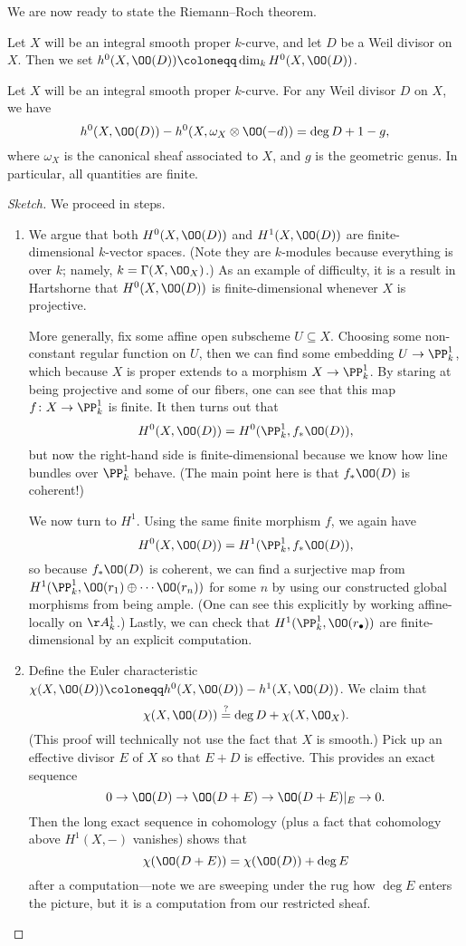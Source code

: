 \documentclass[../notes.tex]{subfiles}
\begin{document}
We are now ready to state the Riemann--Roch theorem.
\begin{notation}
	Let $X$ will be an integral smooth proper $k$-curve, and let $D$ be a Weil divisor on $X$. Then we set $h^0(X,\OO(D))\coloneqq\dim_kH^0(X,\OO(D))$.
\end{notation}
\begin{theorem} \label{thm:rr}
	Let $X$ will be an integral smooth proper $k$-curve. For any Weil divisor $D$ on $X$, we have
	\[h^0(X,\OO(D))-h^0(X,\omega_X\otimes\OO(-d))=\deg D+1-g,\]
	where $\omega_X$ is the canonical sheaf associated to $X$, and $g$ is the geometric genus. In particular, all quantities are finite.
\end{theorem}
\begin{proof}[Sketch]
	We proceed in steps.
	\begin{enumerate}
		\item We argue that both $H^0(X,\OO(D))$ and $H^1(X,\OO(D))$ are finite-dimensional $k$-vector spaces. (Note they are $k$-modules because everything is over $k$; namely, $k=\Gamma(X,\OO_X)$.) As an example of difficulty, it is a result in Hartshorne \cite[Theorem~5.19]{hartshorne} that $H^0(X,\OO(D))$ is finite-dimensional whenever $X$ is projective.

		More generally, fix some affine open subscheme $U\subseteq X$. Choosing some non-constant regular function on $U$, then we can find some embedding $U\to\PP^1_k$, which because $X$ is proper extends to a morphism $X\to\PP^1_k$. By staring at being projective and some of our fibers, one can see that this map $f\colon X\to\PP^1_k$ is finite. It then turns out that
		\[H^0(X,\OO(D))=H^0(\PP^1_k,f_*\OO(D)),\]
		but now the right-hand side is finite-dimensional because we know how line bundles over $\PP^1_k$ behave. (The main point here is that $f_*\OO(D)$ is coherent!)

		We now turn to $H^1$. Using the same finite morphism $f$, we again have
		\[H^0(X,\OO(D))=H^1(\PP^1_k,f_*\OO(D)),\]
		so because $f_*\OO(D)$ is coherent, we can find a surjective map from $H^1(\PP^1_k,\OO(r_1)\oplus\cdots\OO(r_n))$ for some $n$ by using our constructed global morphisms from being ample. (One can see this explicitly by working affine-locally on $\AA^1_k$.) Lastly, we can check that $H^1(\PP^1_k,\OO(r_\bullet))$ are finite-dimensional by an explicit computation.

		\item Define the Euler characteristic $\chi(X,\OO(D))\coloneqq h^0(X,\OO(D))-h^1(X,\OO(D))$. We claim that
		\[\chi(X,\OO(D))\stackrel?=\deg D+\chi(X,\OO_X).\]
		(This proof will technically not use the fact that $X$ is smooth.) Pick up an effective divisor $E$ of $X$ so that $E+D$ is effective. This provides an exact sequence
		\[0\to\OO(D)\to\OO(D+E)\to\OO(D+E)|_E\to0.\]
		Then the long exact sequence in cohomology (plus a fact that cohomology above $H^1(X,-)$ vanishes) shows that
		\[\chi(\OO(D+E))=\chi(\OO(D))+\deg E\]
		after a computation---note we are sweeping under the rug how $\deg E$ enters the picture, but it is a computation from our restricted sheaf.


\end{enumerate}
\end{proof}
\end{document}
